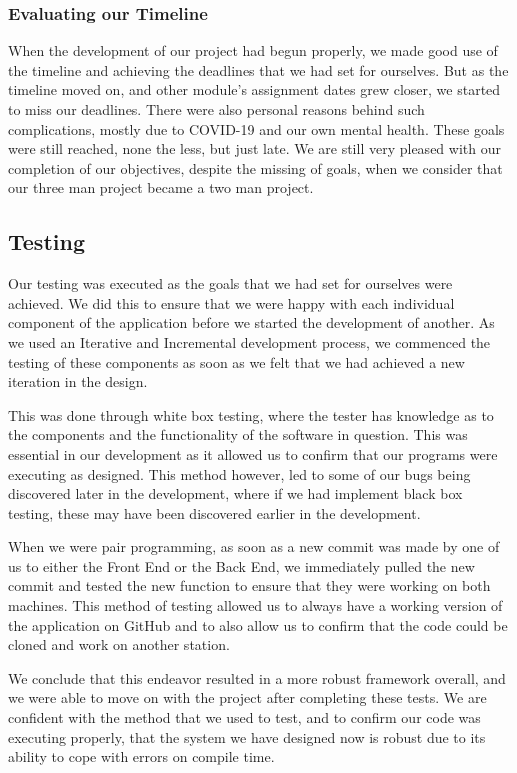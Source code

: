 \subsubsection{Evaluating our Timeline}
When the development of our project had begun properly, we made good use of the timeline and achieving the deadlines that we had set for ourselves. But as the timeline moved on, and other module's assignment dates grew closer, we started to miss our deadlines. There were also personal reasons behind such complications, mostly due to COVID-19 and our own mental health. These goals were still reached, none the less, but just late. We are still very pleased with our completion of our objectives, despite the missing of goals, when we consider that our three man project became a two man project.
\subsection{Testing}
Our testing was executed as the goals that we had set for ourselves were achieved. We did this to ensure that we were happy with each individual component of the application before we started the development of another. As we used an Iterative and Incremental development process, we commenced the testing of these components as soon as we felt that we had achieved a new iteration in the design.\par
This was done through white box testing, where the tester has knowledge as to the components and the functionality of the software in question. This was essential in our development as it allowed us to confirm that our programs were executing as designed. This method however, led to some of our bugs being discovered later in the development, where if we had implement black box testing, these may have been discovered earlier in the development. \par 
When we were pair programming, as soon as a new commit was made by one of us to either the Front End or the Back End, we immediately pulled the new commit and tested the new function to ensure that they were working on both machines. This method of testing allowed us to always have a working version of the application on GitHub and to also allow us to confirm that the code could be cloned and work on another station.\par
We conclude that this endeavor resulted in a more robust framework overall, and we were able to move on with the project after completing these tests. We are confident with the method that we used to test, and to confirm our code was executing properly, that the system we have designed now is robust due to its ability to cope with errors on compile time.
